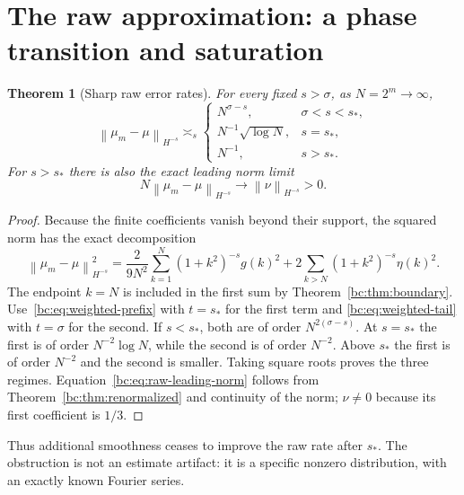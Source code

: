 \documentclass[11pt,a4paper,oneside,openany]{book}
\numberwithin{equation}{chapter}
\newtheorem{theorem}{Theorem}[chapter]
\theoremstyle{definition}
\theoremstyle{remark}
\newcommand{\norm}[1]{\left\lVert #1\right\rVert}
\begin{document}
\section{The raw approximation: a phase transition and saturation}
\begin{theorem}[Sharp raw error rates]
\label{bc:thm:raw-rate}
For every fixed $s>\sigma$, as $N=2^m\to\infty$,
\begin{equation}
 \boxed{\quad
 \norm{\mu_m-\mu}_{H^{-s}}\asymp_s
 \begin{cases}
 N^{\sigma-s},&\sigma<s<s_*,\\
 N^{-1}\sqrt{\log N},&s=s_*,\\
 N^{-1},&s>s_*.
 \end{cases}\quad}
 \label{bc:eq:raw-rates}
\end{equation}
For $s>s_*$ there is also the exact leading norm limit
\begin{equation}
 N\norm{\mu_m-\mu}_{H^{-s}}\longrightarrow\norm{\nu}_{H^{-s}}>0.
 \label{bc:eq:raw-leading-norm}
\end{equation}
\end{theorem}
\begin{proof}
Because the finite coefficients vanish beyond their support, the squared norm
has the exact decomposition
\begin{equation}
 \norm{\mu_m-\mu}_{H^{-s}}^2
 =\frac{2}{9N^2}\sum_{k=1}^{N}(1+k^2)^{-s}g(k)^2
   +2\sum_{k>N}(1+k^2)^{-s}\eta(k)^2.
 \label{bc:eq:exact-norm-decomposition}
\end{equation}
The endpoint $k=N$ is included in the first sum by Theorem~\ref{bc:thm:boundary}.
Use~\eqref{bc:eq:weighted-prefix} with $t=s_*$ for the first term and
\eqref{bc:eq:weighted-tail} with $t=\sigma$ for the second. If $s<s_*$, both are
of order $N^{2(\sigma-s)}$. At $s=s_*$ the first is of order
$N^{-2}\log N$, while the second is of order $N^{-2}$. Above $s_*$ the first
is of order $N^{-2}$ and the second is smaller. Taking square roots proves the
three regimes. Equation~\eqref{bc:eq:raw-leading-norm} follows from
Theorem~\ref{bc:thm:renormalized} and continuity of the norm; $\nu\ne0$ because
its first coefficient is $1/3$.
\end{proof}

Thus additional smoothness ceases to improve the raw rate after $s_*$. The
obstruction is not an estimate artifact: it is a specific nonzero distribution,
with an exactly known Fourier series.
\end{document}
